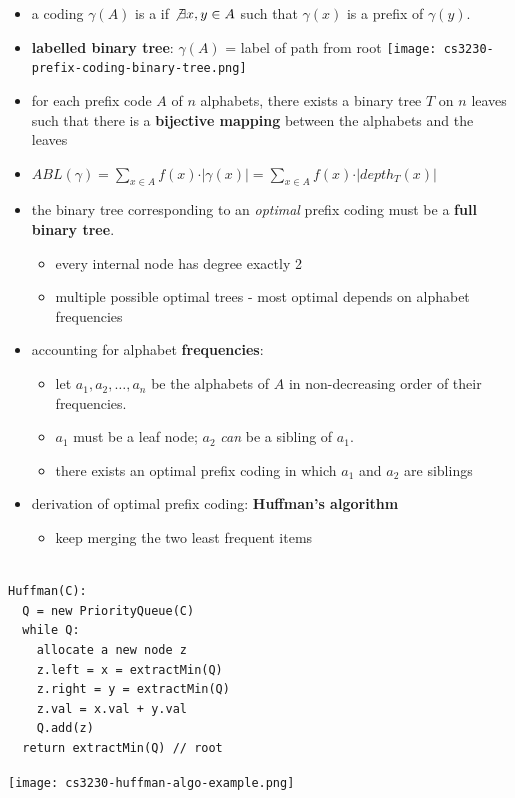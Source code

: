 \documentclass[10pt, landscape]{article}
\begin{document}
\begin{multicols*}{4}
  \begin{itemize}
    \item a coding $\gamma(A)$ is a  if $\not\exists x, y \in A$ such that $\gamma(x)$ is a prefix of $\gamma(y)$.
    \item \textbf{labelled binary tree}: $\gamma(A)$ = label of path from root
      \texttt{[image: cs3230-prefix-coding-binary-tree.png]} 
    \item for each prefix code $A$ of $n$ alphabets, there exists a binary tree $T$ on $n$ leaves such that there is a \textbf{bijective mapping} between the alphabets and the leaves
    \item $ABL(\gamma) = \sum\limits_{x \in A} f(x) \cdot \vert \gamma(x) \vert = \sum\limits_{x \in A} f(x) \cdot \vert depth_T (x) \vert$
    \item the binary tree corresponding to an \textit{optimal} prefix coding must be a \textbf{full binary tree}.
      \begin{itemize}
        \item every internal node has degree exactly 2
        \item multiple possible optimal trees - most optimal depends on alphabet frequencies
      \end{itemize}
    \item accounting for alphabet \textbf{frequencies}:
      \begin{itemize}
        \item let $a_1, a_2, \dots, a_n$ be the alphabets of $A$ in non-decreasing order of their frequencies.
        \item $a_1$ must be a leaf node; $a_2$ \textit{can} be a sibling of $a_1$.
        \item there exists an optimal prefix coding in which $a_1$ and $a_2$ are siblings
      \end{itemize}
    \item derivation of optimal prefix coding: \textbf{Huffman's algorithm}
      \begin{itemize}
        \item keep merging the two least frequent items
      \end{itemize}
  \end{itemize}

  \begin{minipage}[c]{0.65\linewidth}
    \begin{verbatim}

Huffman(C):
  Q = new PriorityQueue(C)
  while Q:
    allocate a new node z
    z.left = x = extractMin(Q)
    z.right = y = extractMin(Q)
    z.val = x.val + y.val
    Q.add(z)
  return extractMin(Q) // root
    \end{verbatim}
  \end{minipage}
  \begin{minipage}[c]{0.32\linewidth}
    \texttt{[image: cs3230-huffman-algo-example.png]} 
  \end{minipage}



\end{multicols*}
\end{document}
